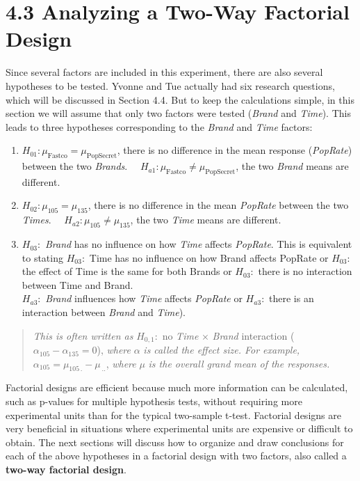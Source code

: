 \documentclass[
]{report}
\theoremstyle{definition}
\theoremstyle{definition}
\theoremstyle{definition}
\theoremstyle{definition}
\theoremstyle{remark}
\begin{document}
\hypertarget{analyzing-a-two-way-factorial-design}{%
\section{4.3 Analyzing a Two-Way Factorial Design}\label{analyzing-a-two-way-factorial-design}}

Since several factors are included in this experiment, there are also several hypotheses to be tested. Yvonne and Tue actually had six research questions, which will be discussed in Section 4.4. But to keep the calculations simple, in this section we will assume that only two factors were tested (\emph{Brand} and \emph{Time}). This leads to three hypotheses corresponding to the \emph{Brand} and \emph{Time} factors:

\begin{enumerate}
\def\labelenumi{\arabic{enumi}.}
\item
  \(H_{01}: \mu_{\text{Fastco}} = \mu_{\text{PopSecret}}\), there is no difference in the mean response (\emph{PopRate}) between the two \emph{Brands}.
  \(\quad H_{a1}: \mu_{\text{Fastco}} \neq \mu_{\text{PopSecret}}\), the two \emph{Brand} means are different.
\item
  \(H_{02}: \mu_{105} = \mu_{135}\), there is no difference in the mean \emph{PopRate} between the two \emph{Times}.
  \(\quad H_{a2}: \mu_{105} \neq \mu_{135}\), the two \emph{Time} means are different.
\item
  \(H_{03}:\) \emph{Brand} has no influence on how \emph{Time} affects \emph{PopRate}. This is equivalent to stating \(H_{03}:\) Time has no influence on how Brand affects PopRate or \(H_{03}:\) the effect of Time is the same for both Brands or \(H_{03}:\) there is no interaction between Time and Brand.\\
  \(H_{a3}:\) \emph{Brand} influences how \emph{Time} affects \emph{PopRate} or \(H_{a3}:\) there is an interaction between \emph{Brand} and \emph{Time}).
\end{enumerate}

\begin{quote}
\emph{This is often written as} \(H_{0,1}:\) no \emph{Time} × \emph{Brand} interaction (\(\alpha_{105} - \alpha_{135} = 0\)), \emph{where} \(\alpha\) \emph{is called the effect size. For example,} \(\alpha_{105} = \mu_{105\,.} - \mu_{\,..}\), \emph{where} \(\mu\) \emph{is the overall grand mean of the responses.}
\end{quote}

Factorial designs are efficient because much more information can be calculated, such as p-values for
multiple hypothesis tests, without requiring more experimental units than for the typical two-sample t-test.
Factorial designs are very beneficial in situations where experimental units are expensive or difficult to obtain.
The next sections will discuss how to organize and draw conclusions for each of the above hypotheses in a
factorial design with two factors, also called a \textbf{two-way factorial design}.
\end{document}

